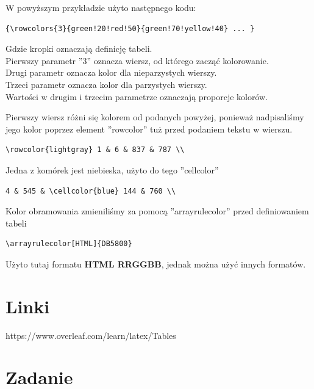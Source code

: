 \documentclass[table]{beamer}
\begin{document}
\begin{frame}[fragile]

W powyższym przykładzie użyto następnego kodu:
\begin{verbatim}
{\rowcolors{3}{green!20!red!50}{green!70!yellow!40} ... }
\end{verbatim}
Gdzie kropki oznaczają definicję tabeli.\\
Pierwszy parametr ''3'' oznacza wiersz, od którego zacząć kolorowanie.\\
Drugi parametr oznacza kolor dla nieparzystych wierszy.\\
Trzeci parametr oznacza kolor dla parzystych wierszy.\\
Wartości w drugim i trzecim parametrze oznaczają proporcje kolorów.\\

\end{frame}

\begin{frame}[fragile]
Pierwszy wiersz różni się kolorem od podanych powyżej, ponieważ nadpisaliśmy jego kolor poprzez element ''rowcolor'' tuż przed podaniem tekstu w wierszu.
\begin{verbatim}
\rowcolor{lightgray} 1 & 6 & 837 & 787 \\ 
\end{verbatim}
Jedna z komórek jest niebieska, użyto do tego ''cellcolor''
\begin{verbatim}
4 & 545 & \cellcolor{blue} 144 & 760 \\
\end{verbatim}
Kolor obramowania zmieniliśmy za pomocą ''arrayrulecolor'' przed definiowaniem tabeli
\begin{verbatim}
\arrayrulecolor[HTML]{DB5800}
\end{verbatim}
Użyto tutaj formatu \textbf{HTML RRGGBB}, jednak można użyć innych formatów.
\end{frame}



\section{Linki}
\begin{frame}
 https://www.overleaf.com/learn/latex/Tables
\end{frame}

\section{Zadanie}
\end{document}
